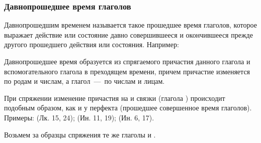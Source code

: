 \documentclass[11pt,a4paper,oneside]{memoir}
\begin{document}
                \subsubsection{Давнопрошедшее время глаголов}
                
    Давнопрошедшим временем называется такое прошедшее время глаголов, которое выражает действие или состояние давно совершившееся и окончившееся прежде другого прошедшего действия или состояния. Например:
    
    \bigskip{}
    
    Давнопрошедшее время образуется из спрягаемого причастия данного глагола и вспомогательного глагола {} в преходящем времени, причем причастие изменяется по родам и числам, а глагол~---~по числам и лицам.
    
    При спряжении изменение причастия на {} и связки (глагола {}) происходит подобным образом, как и у перфекта (прошедшее совершенное время глаголов). Примеры: {} (Лк. 15, 24); {} (Ин. 11, 19); {} (Ин. 6, 17).
    
    Возьмем за образцы спряжения те же глаголы {} и {}.
    
\end{document}
